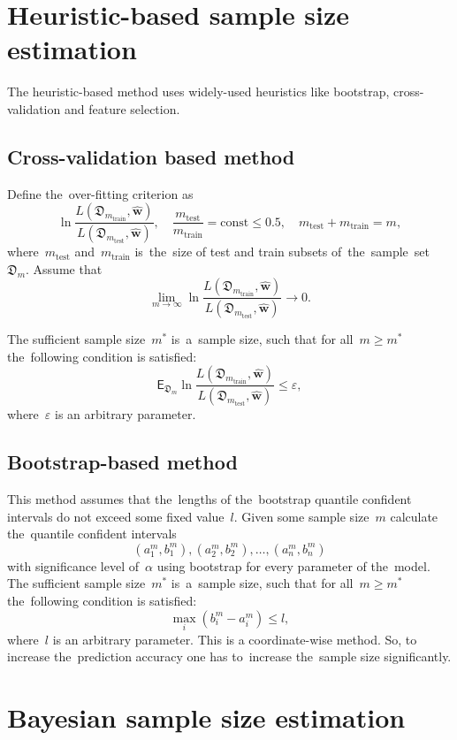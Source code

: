 \documentclass[
11pt,%
tightenlines,%
twoside,%
onecolumn,%
nofloats,%
nobibnotes,%
nofootinbib,%
superscriptaddress,%
noshowpacs,%
centertags]%
{revtex4}
\begin{document}
\section{Heuristic-based sample size estimation}
The heuristic-based method uses widely-used heuristics like bootstrap, cross-validation and feature selection.
 
\subsection{Cross-validation based method}
Define the~over-fitting criterion as
\[
\label{eq:hb:5}
	\ln\frac{L(\mathfrak{D}_{m_{\text{train}}}, \hat{\mathbf{w}})}{L(\mathfrak{D}_{m_{\text{test}}}, \hat{\mathbf{w}})}, \quad \frac{m_{\text{test}}}{m_{\text{train}}} = \text{const} \leq 0.5, \quad m_{\text{test}} + m_{\text{train}} = m,
\]
where~$m_{\text{test}}$ and~$m_{\text{train}}$ is~the~size of test and train subsets of~the~sample~set~$\mathfrak{D}_{m}$.
Assume that 
\[
\label{eq:hb:6}
	\lim_{m\to \infty}\ln\frac{L(\mathfrak{D}_{m_{\text{train}}}, \hat{\mathbf{w}})}{L(\mathfrak{D}_{m_{\text{test}}}, \hat{\mathbf{w}})} \to 0.
\]

The sufficient sample size~$m^*$ is~a~sample size, such that for all~$m \geq m^*$ the~following condition is satisfied:
\[
\label{eq:hb:7}
	\mathsf{E}_{\mathfrak{D}_{m}}\ln\frac{L(\mathfrak{D}_{m_{\text{train}}}, \hat{\mathbf{w}})}{L(\mathfrak{D}_{m_{\text{test}}}, \hat{\mathbf{w}})} \leq \varepsilon,
\]
where~$\varepsilon$ is an arbitrary parameter.

\subsection{Bootstrap-based method}
This method assumes that the~lengths of the~bootstrap quantile confident intervals do not exceed some fixed value~$l$. Given some sample size~$m$ calculate the~quantile confident intervals~
\[
\left(a^m_1, b^m_1\right), \left(a^m_2, b^m_2\right), \dots, \left(a^m_n, b^m_n\right)
\]
with significance level of~$\alpha$ using bootstrap for every parameter of the~model. The sufficient sample size~$m^*$ is~a~sample size, such that for all~$m \geq m^*$ the~following condition is satisfied:
\[
\label{eq:hb:8}
	\max_i\left(b^m_i - a^m_i\right) \leq l,
\]
where~$l$ is an arbitrary parameter. This is a coordinate-wise method. So, to increase the~prediction accuracy one has to~increase the~sample size significantly.
 
\section{Bayesian sample size estimation}
\end{document}
